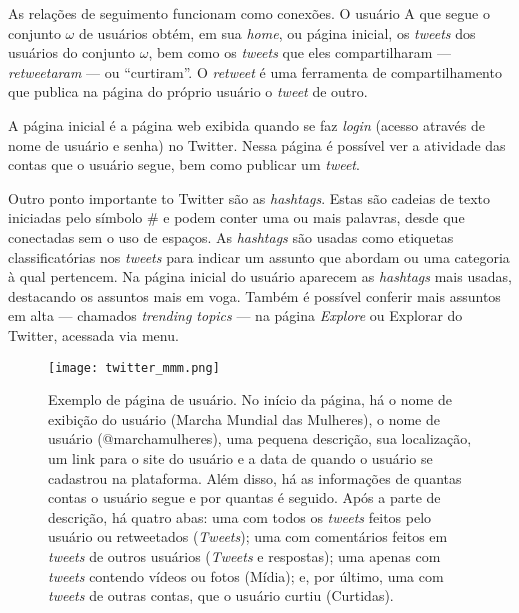 \documentclass[
	12pt,				%
	openright,			%
	twoside,			%
	a4paper,			%
	english,			%
	brazil				%
	]{abntex2}
\begin{document}
 As relações de seguimento funcionam como conexões. O usuário A que segue o conjunto $\omega$ de usuários obtém, em sua \emph{home}, ou página inicial, os \emph{tweets} dos usuários do conjunto $\omega$, bem como os \emph{tweets} que eles compartilharam --- \emph{retweetaram} --- ou ``curtiram''. O \emph{retweet} é uma ferramenta de compartilhamento que publica na página do próprio usuário o \emph{tweet} de outro.

 A página inicial é a página web exibida quando se faz \emph{login} (acesso através de nome de usuário e senha) no Twitter. Nessa página é possível ver a atividade das contas que o usuário segue, bem como publicar um \emph{tweet}.

 Outro ponto importante to Twitter são as \emph{hashtags}. Estas são cadeias de texto iniciadas pelo símbolo \# e podem conter uma ou mais palavras, desde que conectadas sem o uso de espaços. As \emph{hashtags} são usadas como etiquetas classificatórias nos \emph{tweets} para indicar um assunto que abordam ou uma categoria à qual pertencem. Na página inicial do usuário aparecem as \emph{hashtags} mais usadas, destacando os assuntos mais em voga. Também é possível conferir mais assuntos em alta --- chamados \emph{trending topics} --- na página \emph{Explore} ou Explorar do Twitter, acessada via menu.
 
 \begin{figure}[!htbp]
    \centering
    \texttt{[image: twitter\_mmm.png]}
    \caption{Exemplo de página de usuário. No início da página, há o nome de exibição do usuário (Marcha Mundial das Mulheres), o nome de usuário (@marchamulheres), uma pequena descrição, sua localização, um link para o site do usuário e a data de quando o usuário se cadastrou na plataforma. Além disso, há as informações de quantas contas o usuário segue e por quantas é seguido. Após a parte de descrição, há quatro abas: uma com todos os \emph{tweets} feitos pelo usuário ou retweetados (\emph{Tweets}); uma com comentários feitos em \emph{tweets} de outros usuários (\emph{Tweets} e respostas); uma apenas com \emph{tweets} contendo vídeos ou fotos (Mídia); e, por último, uma com \emph{tweets} de outras contas, que o usuário curtiu (Curtidas).}
    \label{fig:mmm}
 \end{figure}
\end{document}
